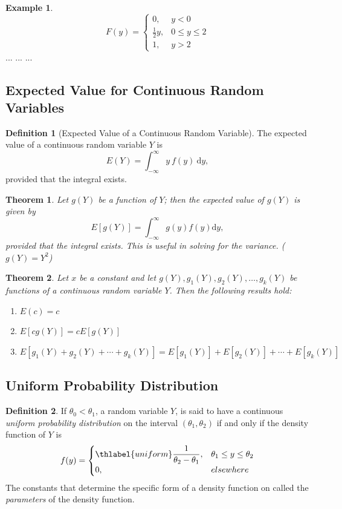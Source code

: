 \documentclass{article}
\theoremstyle{plain}
\newtheorem{thm}{Theorem}[section]
\theoremstyle{definition}
\newtheorem{defn}{Definition}[section]
\newtheorem{example}{Example}[section]
\theoremstyle{remark}
\begin{document}
\begin{example}
$$
  F(y) = 
  \begin{cases}
    0, & y < 0\\
    \frac{1}{2}y, & 0 \leq y \leq 2\\
    1, & y > 2
  \end{cases}
$$
...
...
...
\end{example}

\subsection{Expected Value for Continuous Random Variables}
\begin{defn}[Expected Value of a Continuous Random Variable] 
  The expected value of a continuous random variable $Y$ is
  $$
  E(Y) = \displaystyle \int_{- \infty}^{\infty} y\ f(y)\ \mathrm{d}y,
  $$
  provided that the integral exists.
\end{defn}

\begin{thm}
  Let $g(Y)$ be a function of $Y$; then the expected value of $g(Y)$ is given by
  $$
  E[g(Y)] = \displaystyle \int_{- \infty}^{\infty} g(y) f(y) \mathrm{d}y,
  $$
  provided that the integral exists. This is useful in solving for the variance. ($g(Y) = Y^2$)
\end{thm}

\begin{thm}
  Let $x$ be a constant and let $g(Y), g_1(Y), g_2(Y), \ldots, g_k(Y)$ be functions of a continuous random variable $Y$. Then the following results hold:
  \begin{enumerate}
    \item $E(c) = c$
    \item $E[cg(Y)] = cE[g(Y)]$
    \item $E[g_1(Y) +g_2(Y) + \cdots + g_k(Y)] = E[g_1(Y)] + E[g_2(Y)] + \cdots + E[g_k(Y)]$
  \end{enumerate}
\end{thm}

\subsection{Uniform Probability Distribution}

\begin{defn}
  If $\theta_0 < \theta_1$, a random variable $Y$, is said to have a continuous \textit{uniform probability distribution} on the interval $(\theta_1,\theta_2)$ if and only if the density function of $Y$ is
$$
f(y) =
\begin{cases} \thlabel{uniform}
  \displaystyle \frac{1}{\theta_2 - \theta_1}, & \theta_1 \leq y \leq \theta_2\\
  0, & elsewhere
\end{cases}
$$
The constants that determine the specific form of a density function on called the \textit{parameters} of the density function.
\end{defn}
\end{document}
